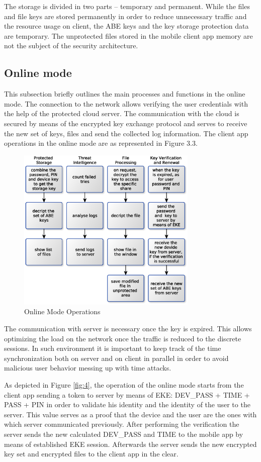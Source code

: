\documentclass[twocolumn]{svjour3}          	%
\begin{document}
The storage is divided in two parts – temporary and permanent. While the files and file keys are stored permanently in order to reduce unnecessary traffic and the resource usage on client, the ABE keys and the key storage protection data are temporary. The unprotected files stored in the mobile client app memory are not the subject of the security architecture.

\subsection{Online mode}
\label{sec_online_mode}
This subsection briefly outlines the main processes and functions in the online mode. The connection to the network allows verifying the user credentials with the help of the protected cloud server. The communication with the cloud is secured by means of the encrypted key exchange protocol \cite{hao2010j, hao2008password} and serves to receive the new set of keys, files and send the collected log information. The client app operations in the online mode are as represented in Figure 3.3.

\begin{figure}[h!]
	\includegraphics[width=8.6cm]{figures/onlinemodeoperations.eps}
	\caption{Online Mode Operations}
	\label{fig:3}
\end{figure}

The communication with server is necessary once the key is expired. This allows optimizing the load on the network once the traffic is reduced to the discrete sessions. In such environment it is important to keep track of the time synchronization both on server and on client in parallel in order to avoid malicious user behavior messing up with time attacks.

As depicted in Figure \ref{fig:4}, the operation of the online mode starts from the client app sending a token to server by means of EKE: DEV\_PASS + TIME + PASS + PIN in order to validate his identity and the identity of the user to the server. This value serves as a proof that the device and the user are the ones with which server communicated previously. After performing the verification the server sends the new calculated DEV\_PASS and TIME to the mobile app by means of established EKE session. Afterwards the server sends the new encrypted key set and encrypted files to the client app in the clear.
\end{document}
